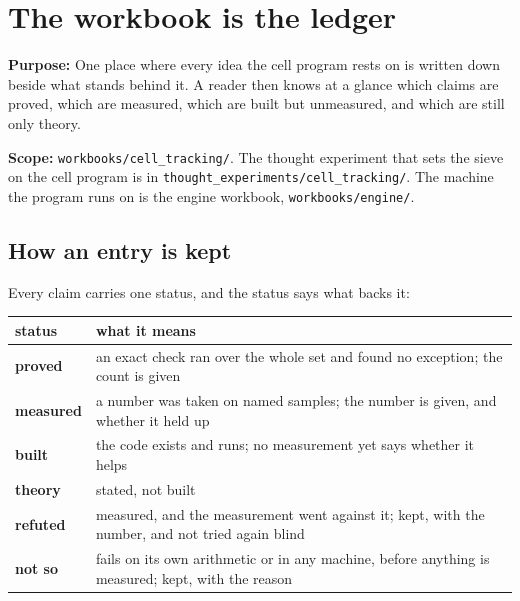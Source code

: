 \chapter{\texorpdfstring{The workbook is the ledger}{The workbook is the ledger}}
\label{chap:readme}

\textbf{Purpose:} One place where every idea the cell program rests on is written down beside what stands behind it. A reader then knows at a glance which claims are proved, which are measured, which are built but unmeasured, and which are still only theory.

\textbf{Scope:} \texttt{workbooks/\allowbreak{}cell\_\allowbreak{}tracking/\allowbreak{}}. The thought experiment that sets the sieve on the cell program is in \texttt{thought\_\allowbreak{}experiments/\allowbreak{}cell\_\allowbreak{}tracking/\allowbreak{}}. The machine the program runs on is the engine workbook, \texttt{workbooks/\allowbreak{}engine/\allowbreak{}}.

\section{\texorpdfstring{How an entry is kept}{How an entry is kept}}

Every claim carries one status, and the status says what backs it:

{\small
\setlength{\tabcolsep}{6pt}
\begin{longtable}{>{\RaggedRight\arraybackslash}p{}>{\RaggedRight\arraybackslash}p{}}
\toprule
status & what it means \\
\midrule
\endhead
\textbf{proved} & an exact check ran over the whole set and found no exception; the count is given \\
\textbf{measured} & a number was taken on named samples; the number is given, and whether it held up \\
\textbf{built} & the code exists and runs; no measurement yet says whether it helps \\
\textbf{theory} & stated, not built \\
\textbf{refuted} & measured, and the measurement went against it; kept, with the number, and not tried again blind \\
\textbf{not so} & fails on its own arithmetic or in any machine, before anything is measured; kept, with the reason \\
\bottomrule
\end{longtable}
}


